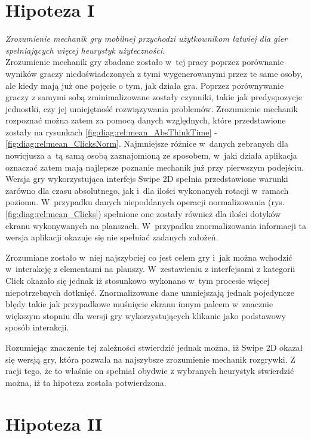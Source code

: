\documentclass[a4paper,12pt,numbers=noenddot]{report}
\begin{document}
\section{Hipoteza I}
\textit{Zrozumienie mechanik gry mobilnej przychodzi użytkownikom łatwiej dla gier spełniających więcej heurystyk użyteczności.}\\

Zrozumienie mechanik gry zbadane zostało w~tej pracy poprzez porównanie wyników graczy niedoświadczonych z tymi wygenerowanymi przez te same osoby, ale kiedy mają już one pojęcie o tym, jak działa gra. Poprzez porównywanie graczy z samymi sobą zminimalizowane zostały czynniki, takie jak predyspozycje jednostki, czy jej umiejętność rozwiązywania problemów. 
Zrozumienie mechanik rozpoznać można zatem za pomocą danych względnych, które przedstawione zostały na rysunkach \ref{fig:diag:rel:mean_AbsThinkTime} - \ref{fig:diag:rel:mean_ClicksNorm}. Najmniejsze różnice w~danych zebranych dla nowicjusza a~tą samą osobą zaznajomioną ze sposobem, w~jaki działa aplikacja oznaczać zatem mają najlepsze poznanie mechanik już przy pierwszym podejściu.\\

Wersja gry wykorzystująca interfejs Swipe 2D spełnia przedstawione warunki zarówno dla czasu absolutnego, jak i~dla ilości wykonanych rotacji w~ramach poziomu. W~przypadku danych niepoddanych operacji normalizowania (rys. \ref{fig:diag:rel:mean_Clicks}) spełnione one zostały również dla ilości dotyków ekranu wykonywanych na planszach. W~przypadku znormalizowania informacji ta wersja aplikacji okazuje się nie spełniać zadanych założeń.

Zrozumiane zostało w~niej najszybciej co jest celem gry i~jak można wchodzić w~interakcję z elementami na planszy. W~zestawieniu z interfejsami z kategorii Click okazało się jednak iż stosunkowo wykonano w~tym procesie więcej niepotrzebnych dotknięć. Znormalizowane dane umniejszają jednak pojedyncze błędy takie jak przypadkowe muśnięcie ekranu innym palcem w~znacznie większym stopniu dla wersji gry wykorzystujących klikanie jako podstawowy sposób interakcji. 

Rozumiejąc znaczenie tej zależności stwierdzić jednak można, iż Swipe 2D okazał się wersją gry, która pozwala na najszybsze zrozumienie mechanik rozgrywki. Z racji tego, że to właśnie on spełniał obydwie z wybranych heurystyk stwierdzić można, iż ta hipoteza została potwierdzona.

\section{Hipoteza II}
\end{document}

